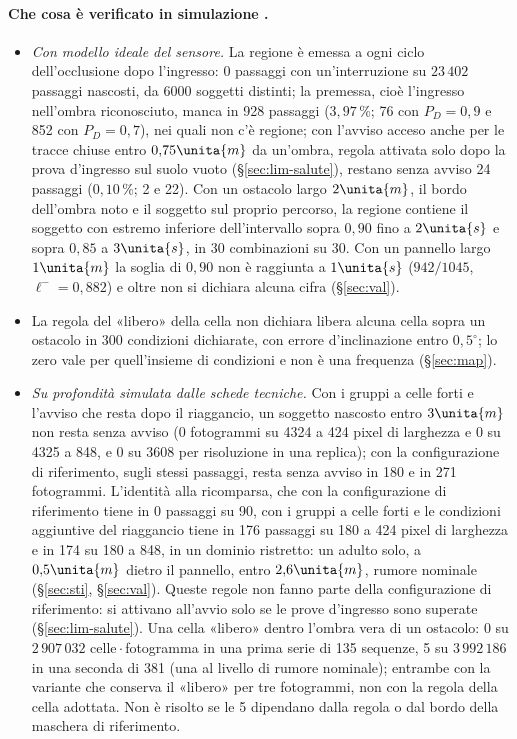 \paragraph{Che cosa è verificato in simulazione .}
\begin{itemize}
\item \emph{Con modello ideale del sensore.} La regione è emessa a ogni ciclo dell'occlusione dopo l'ingresso: 0 passaggi con un'interruzione su $23\,402$ passaggi nascosti, da 6000 soggetti distinti; la premessa, cioè l'ingresso nell'ombra riconosciuto, manca in 928 passaggi ($3{,}97\,\%$; 76 con $P_D=0{,}9$ e 852 con $P_D=0{,}7$), nei quali non c'è regione; con l'avviso acceso anche per le tracce chiuse entro $0{,}75\unita{m}$ da un'ombra, regola attivata solo dopo la prova d'ingresso sul suolo vuoto (\S\ref{sec:lim-salute}), restano senza avviso 24 passaggi ($0{,}10\,\%$; 2 e 22). Con un ostacolo largo $2\unita{m}$, il bordo dell'ombra noto e il soggetto sul proprio percorso, la regione contiene il soggetto con estremo inferiore dell'intervallo sopra $0{,}90$ fino a $2\unita{s}$ e sopra $0{,}85$ a $3\unita{s}$, in 30 combinazioni su 30. Con un pannello largo $1\unita{m}$ la soglia di $0{,}90$ non è raggiunta a $1\unita{s}$ ($942/1045$, $\ell^-=0{,}882$) e oltre non si dichiara alcuna cifra (\S\ref{sec:val}).
\item La regola del «libero» della cella non dichiara libera alcuna cella sopra un ostacolo in 300 condizioni dichiarate, con errore d'inclinazione entro $0{,}5^\circ$; lo zero vale per quell'insieme di condizioni e non è una frequenza (\S\ref{sec:map}).
\item \emph{Su profondità simulata dalle schede tecniche.} Con i gruppi a celle forti e l'avviso che resta dopo il riaggancio, un soggetto nascosto entro $3\unita{m}$ non resta senza avviso (0 fotogrammi su 4324 a 424 pixel di larghezza e 0 su 4325 a 848, e 0 su 3608 per risoluzione in una replica); con la configurazione di riferimento, sugli stessi passaggi, resta senza avviso in 180 e in 271 fotogrammi. L'identità alla ricomparsa, che con la configurazione di riferimento tiene in 0 passaggi su 90, con i gruppi a celle forti e le condizioni aggiuntive del riaggancio tiene in 176 passaggi su 180 a 424 pixel di larghezza e in 174 su 180 a 848, in un dominio ristretto: un adulto solo, a $0{,}5\unita{m}$ dietro il pannello, entro $2{,}6\unita{m}$, rumore nominale (\S\ref{sec:sti}, \S\ref{sec:val}). Queste regole non fanno parte della configurazione di riferimento: si attivano all'avvio solo se le prove d'ingresso sono superate (\S\ref{sec:lim-salute}). Una cella «libero» dentro l'ombra vera di un ostacolo: 0 su $2\,907\,032$ celle\,$\cdot$\,fotogramma in una prima serie di 135 sequenze, 5 su $3\,992\,186$ in una seconda di 381 (una al livello di rumore nominale); entrambe con la variante che conserva il «libero» per tre fotogrammi, non con la regola della cella adottata. Non è risolto se le 5 dipendano dalla regola o dal bordo della maschera di riferimento.

\end{itemize}
